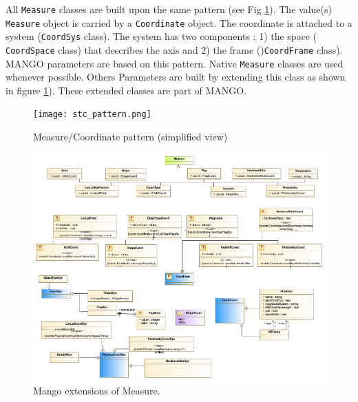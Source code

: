 \documentclass[11pt,a4paper]{ivoa}
\begin{document}
All \texttt{Measure} classes are built upon the same pattern (see Fig \ref{fig:stcpattern}). 
The value(s) \texttt{Measure} object is carried by a \texttt{Coordinate} object. 
The coordinate is attached to a system  (\texttt{CoordSys} class). 
The system has two components : 1) the space  ( \texttt{CoordSpace} class) that describes the axis and 2) the frame ()\texttt{CoordFrame} class).  
MANGO parameters are based on this pattern. 
Native  \texttt{Measure} classes are used whenever possible. 
Others Parameters are built by extending this class as shown in figure \ref{fig:stcpattern}). 
These extended classes are part of MANGO.
\begin{figure}
     \texttt{[image: stc\_pattern.png]}
     \caption{Measure/Coordinate pattern (simplified view)}
     \label{fig:stcpattern}
\end{figure}

\begin{figure}
  \includegraphics[angle=90,origin=c,width=1\textwidth]{../model/mangoMctExt.png}
  \caption{Mango extensions of Measure.}
  \label{fig:stcextension}
\end{figure}
\end{document}
